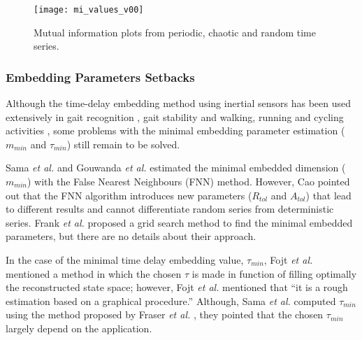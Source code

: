 \documentclass[10pt,journal,compsoc]{IEEEtran}
\begin{document}
\begin{figure}[!htb]
\centering    
 \texttt{[image: mi\_values\_v00]}
\caption[PA]{Mutual information plots from periodic, chaotic and random time series.}
\label{fig:mi}
\end{figure}


\subsubsection{Embedding Parameters Setbacks}
Although the time-delay embedding method using inertial sensors has been used extensively 
in gait recognition \cite{Sama2013}, gait stability \cite{Gouwanda2012} and walking, 
running and cycling activities \cite{Frank2010},
some problems with the minimal embedding parameter estimation  
($m_{min}$ and $\tau_{min}$) still remain to be solved.


Sama \emph{et al.} \cite{Sama2013} and Gouwanda \emph{et al.} \cite{Gouwanda2012}
estimated the minimal embedded dimension ($m_{min}$) 
with the False Nearest Neighbours (FNN) method. However, Cao \cite{Cao1997} pointed out that 
the FNN algorithm introduces new parameters ($R_{tol}$ and $A_{tol}$) that lead 
to different results and  cannot differentiate random series from deterministic series. 
Frank \emph{et al.} \cite{Frank2010} proposed a grid search method to find the minimal 
embedded parameters, but there are no details about their approach.

In the case of the minimal time delay embedding value, $\tau_{min}$,
Fojt \emph{et al.} \cite{Fojt1998} mentioned a method in which the chosen $\tau$ 
is made in function of filling optimally the reconstructed state space;
however, Fojt \emph{et al.} \cite{Fojt1998} mentioned
that ``it is a rough estimation based on a graphical procedure.''
Although, Sama \emph{et al.} \cite{Sama2013} computed $\tau_{min}$ using 
the method proposed by Fraser \emph{et al.} \cite{Fraser1986}, 
they pointed that the chosen $\tau_{min}$ largely depend on the application.


% 
\end{document}
